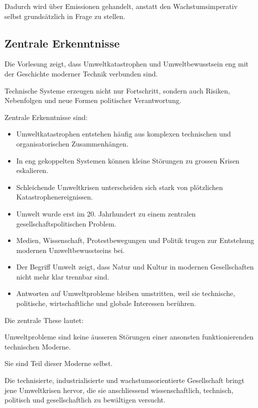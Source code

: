 Dadurch wird über Emissionen gehandelt,
anstatt den Wachstumsimperativ selbst
grundsätzlich in Frage zu stellen.

\subsection{Zentrale Erkenntnisse}

Die Vorlesung zeigt,
dass Umweltkatastrophen
und Umweltbewusstsein
eng mit der Geschichte moderner Technik verbunden sind.

Technische Systeme erzeugen nicht nur Fortschritt,
sondern auch Risiken,
Nebenfolgen
und neue Formen politischer Verantwortung.

Zentrale Erkenntnisse sind:

\begin{itemize}
\item Umweltkatastrophen entstehen häufig aus komplexen technischen und organisatorischen Zusammenhängen.
\item In eng gekoppelten Systemen können kleine Störungen zu grossen Krisen eskalieren.
\item Schleichende Umweltkrisen unterscheiden sich stark von plötzlichen Katastrophenereignissen.
\item Umwelt wurde erst im 20. Jahrhundert zu einem zentralen gesellschaftspolitischen Problem.
\item Medien, Wissenschaft, Protestbewegungen und Politik trugen zur Entstehung modernen Umweltbewusstseins bei.
\item Der Begriff Umwelt zeigt, dass Natur und Kultur in modernen Gesellschaften nicht mehr klar trennbar sind.
\item Antworten auf Umweltprobleme bleiben umstritten, weil sie technische, politische, wirtschaftliche und globale Interessen berühren.
\end{itemize}

Die zentrale These lautet:

Umweltprobleme sind keine äusseren Störungen
einer ansonsten funktionierenden technischen Moderne.

Sie sind Teil dieser Moderne selbst.

Die technisierte,
industrialisierte
und wachstumsorientierte Gesellschaft
bringt jene Umweltkrisen hervor,
die sie anschliessend wissenschaftlich,
technisch,
politisch
und gesellschaftlich zu bewältigen versucht.
